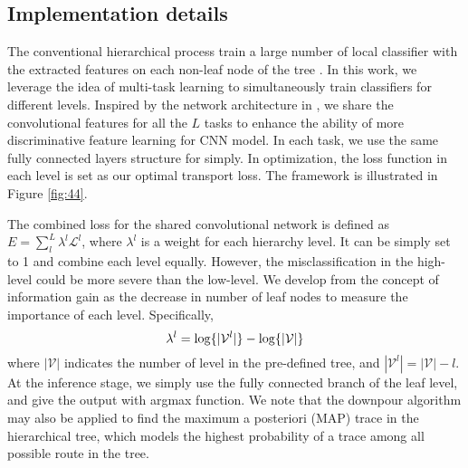 \documentclass{article}
\theoremstyle{plain}%
\begin{document}
 










 




\subsection{Implementation details}



The conventional hierarchical process train a large number of local classifier with the extracted features on each non-leaf node of the tree \cite{zhao2018embedding}. In this work, we leverage the idea of multi-task learning to simultaneously train classifiers for different levels. Inspired by the network architecture in \cite{ma2018end-to-end}, we share the convolutional features for all the $L$ tasks to enhance the ability of more discriminative feature learning for CNN model. In each task, we use the same fully connected layers structure for simply. In optimization, the loss function in each level is set as our optimal transport loss. The framework is illustrated in Figure \ref{fig:44}.


The combined loss for the shared convolutional network is defined as $E=\sum_l^L\lambda^l\mathcal{L}^l$, where $\lambda^l$ is a weight for each hierarchy level. It can be simply set to 1 and combine each level equally. However, the misclassification in the high-level could be more severe than the low-level. We develop from the concept of information gain \cite{deng2012hedging} as the decrease in number of leaf nodes to measure the importance of each level. Specifically, \begin{equation}
\lambda^l={\rm log}\{{|\mathcal{V}^l|}\}-{\rm log}\{{|\mathcal{V}|}\}
\end{equation} where ${|\mathcal{V}|}$ indicates the number of level in the pre-defined tree, and $|\mathcal{V}^l|={|\mathcal{V}|}-l$. At the inference stage, we simply use the fully connected branch of the leaf level, and give the output with argmax function. We note that the downpour algorithm \cite{wu2017hinet} may also be applied to find the maximum a posteriori (MAP) trace in the hierarchical tree, which models the highest probability of a trace among all possible route in the tree. 
\end{document}
